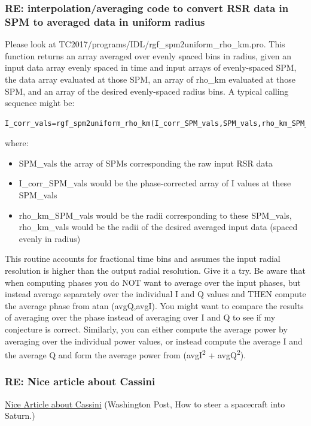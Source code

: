 \documentclass[crop=false,class=book]{standalone}
\begin{document}
\subsubsection{\footnotesize RE: interpolation/averaging code to convert RSR data in SPM to averaged data in uniform radius}
Please look at TC2017/programs/IDL/rgf\_spm2uniform\_rho\_km.pro. This function returns an array averaged over evenly spaced bins in radius, given an input data array evenly spaced in time and input arrays of evenly-spaced SPM, the data array evaluated at those SPM, an array of rho\_km evaluated at those SPM, and an array of the desired evenly-spaced radius bins. A typical calling sequence might be:
\begin{lstlisting}[language=IDL]
I_corr_vals=rgf_spm2uniform_rho_km(I_corr_SPM_vals,SPM_vals,rho_km_SPM_vals,rho_km_vals)
\end{lstlisting}
where:
\begin{itemize}
    \item SPM\_vals the array of SPMs corresponding the raw input RSR data
    \item I\_corr\_SPM\_vals would be the phase-corrected array of I values at these SPM\_vals
    \item rho\_km\_SPM\_vals would be the radii corresponding to these SPM\_vals,
    rho\_km\_vals would be the radii of the desired averaged input data (spaced evenly in radius)
\end{itemize}
This routine accounts for fractional time bins and assumes the input radial resolution is higher than the output radial resolution. Give it a try. Be aware that when computing phases you do NOT want to average over the input phases, but instead average separately over the individual I and Q values  and THEN compute the average phase from atan (avgQ,avgI). You might want to compare the results of averaging over the phase instead of averaging over I and Q to see if my conjecture is correct. Similarly, you can either compute the average power by averaging over the individual power values, or instead compute the average I and the average Q and form the average power from (avgI\textsuperscript{2} + avgQ\textsuperscript{2}).
\subsubsection{\footnotesize RE: Nice article about Cassini}
\href{https://www.washingtonpost.com/national/health-science/how-to-steer-a-spacecraft-into-saturn/2017/09/09/ce6a8d18-74af-11e7-8839-ec48ec4cae25_story.html?utm_term=.4aad5c52355d}{Nice Article about Cassini} (Washington Post, How to steer a spacecraft into Saturn.)
\end{document}
